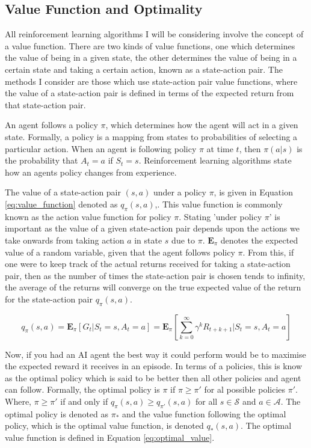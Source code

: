 \documentclass[ %
                    author={Callum Pearce},
                supervisor={Dr. Neill Campbell},
                    degree={MEng},
                     title={How effective are Temporal difference learning methods for reducing the number of zero contribution light paths, while still accurately approximating Global Illumination in Path tracing?},
                  subtitle={},
                      type={research},
                      year={2019} ]{dissertation}
\begin{document}
\subsection{Value Function and Optimality}
All reinforcement learning algorithms I will be considering involve the concept of a value function. There are two kinds of value functions, one which determines the value of being in a given state, the other determines the value of being in a certain state and taking a certain action, known as a state-action pair. The methods I consider are those which use state-action pair value functions, where the value of a state-action pair is defined in terms of the expected return from that state-action pair.

An agent follows a policy $\pi$, which determines how the agent will act in a given state. Formally, a policy is a mapping from states to probabilities of selecting a particular action. When an agent is following policy $\pi$ at time $t$, then $\pi(a|s)$ is the probability that $A_t = a$ if $S_t = s$. Reinforcement learning algorithms state how an agents policy changes from experience. 

The value of a state-action pair $(s,a)$ under a policy $\pi$, is given in Equation \ref{eq:value_function} denoted as $q_\pi(s,a)$,. This value function is commonly known as the action value function for policy $\pi$. Stating 'under policy $\pi$' is important as the value of a given state-action pair depends upon the actions we take onwards from taking action $a$ in state $s$ due to $\pi$. $\mathbf{E}_\pi$ denotes the expected value of a random variable, given that the agent follows policy $\pi$. From this, if one were to keep track of the actual returns received for taking a state-action pair, then as the number of times the state-action pair is chosen tends to infinity, the average of the returns will converge on the true expected value of the return for the state-action pair $q_\pi(s,a)$.

\begin{equation}
\label{eq:value_function}
q_\pi(s, a) = \mathbf{E}_\pi[G_t | S_t = s, A_t = a] = \mathbf{E}_\pi [\sum_{k=0}^{\infty} \gamma^k R_{t+k+1} | S_t = s, A_t = a]
\end{equation}

Now, if you had an AI agent the best way it could perform would be to maximise the expected reward it receives in an episode. In terms of a policies, this is know as the optimal policy which is said to be better then all other policies and agent can follow. Formally, the optimal policy is $\pi$ if $\pi \geq \pi'$ for al possible policies $\pi'$. Where, $\pi \geq \pi'$ if and only if $q_\pi(s,a) \geq q_{\pi'}(s,a)$ for all $s \in \mathcal{S}$ and $a \in \mathcal{A}$. The optimal policy is denoted as $\pi_*$ and the value function following the optimal policy, which is the optimal value function, is denoted $q_*(s,a)$. The optimal value function is defined in Equation \ref{eq:optimal_value}.
\end{document}
